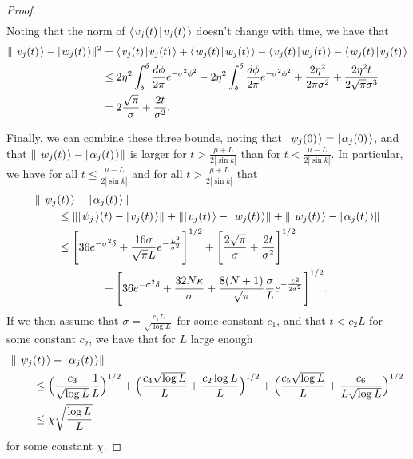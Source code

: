 \documentclass[../thesis-main/thesis-main]{subfiles}
\begin{document}
\begin{proof}
\begin{align}
\end{align}
Noting that the norm of $\langle\mspace{2mu} v_j(t) \mspace{2mu} | \mspace{2mu} v_j(t)\mspace{2mu} \rangle$ doesn't change with time, we have that
\begin{align}
  \|{|\mspace{2mu} v_j(t) \mspace{2mu} \rangle - |\mspace{2mu} w_j(t) \mspace{2mu} \rangle}\|^2 &= \langle\mspace{2mu} v_j(t) \mspace{2mu} | \mspace{2mu} v_j(t)\mspace{2mu} \rangle + \langle\mspace{2mu} w_j(t) \mspace{2mu} | \mspace{2mu} w_j(t)\mspace{2mu} \rangle - \langle\mspace{2mu} v_j(t) \mspace{2mu} | \mspace{2mu} w_j(t)\mspace{2mu} \rangle - \langle\mspace{2mu} w_j(t) \mspace{2mu} | \mspace{2mu} v_j(t)\mspace{2mu} \rangle\\
  &\leq 2 \eta^2 \int_{\delta}^\delta \frac{d\phi}{2\pi} e^{-\sigma^2 \phi^2} - 2\eta^2 \int_{\delta}^\delta \frac{d\phi}{2\pi }e^{ - \sigma^2 \phi^2} + \frac{2\eta^2}{2\pi \sigma^2} + \frac{2 \eta^2 t}{2\sqrt{\pi} \sigma^3}\\
  &= 2 \frac{\sqrt{\pi}}{ \sigma} + \frac{2 t }{\sigma^2}.
\end{align}

Finally, we can combine these three bounds, noting that $|\mspace{2mu} \psi_j(0) \mspace{2mu} \rangle = |\mspace{2mu} \alpha_j(0) \mspace{2mu} \rangle$, and that $\|{|\mspace{2mu} w_j(t) \mspace{2mu} \rangle - |\mspace{2mu} \alpha_j(t) \mspace{2mu} \rangle}\| $ is larger for $ t > \frac{\mu+L}{2|\sin k|}$ than for $t < \frac{\mu- L}{2|\sin k|}$.  In particular, we have for all $t \leq \frac{\mu -L}{2 |\sin k|}$ and for all $t > \frac{\mu + L}{2|\sin k|}$ that
\begin{align}
  &\|{ |\mspace{2mu} \psi_j(t) \mspace{2mu} \rangle - |\mspace{2mu} \alpha_j(t) \mspace{2mu} \rangle}\|\nonumber\\
   &\qquad \leq \|{ |\mspace{2mu} \psi_j \mspace{2mu} \rangle{(t)} - |\mspace{2mu} v_j(t) \mspace{2mu} \rangle}\| + \|{|\mspace{2mu}  v_j(t) \mspace{2mu} \rangle - |\mspace{2mu} w_j(t) \mspace{2mu} \rangle}\| + \|{|\mspace{2mu} w_j(t) \mspace{2mu} \rangle - |\mspace{2mu} \alpha_j(t) \mspace{2mu} \rangle}\|\\
  & \qquad \leq \Bigg[ 36 e^{-\sigma^2 \delta} + \frac{16 \sigma}{\sqrt{\pi} L} e^{-\frac{L^2}{\sigma^2}} \Bigg]^{1/2} + \Bigg[ \frac{2 \sqrt{\pi}}{\sigma} + \frac{2t}{\sigma^2}\Bigg]^{1/2} \nonumber\\
  &\qquad \qquad \qquad + \Bigg[36 e^{ -\sigma^2 \delta} + \frac{32 N \kappa}{\sigma} + \frac{8 (N+1)}{\sqrt{\pi}} \frac{\sigma}{L} e^{-\frac{L^2}{2\sigma^2}} \Bigg] ^{1/2}.
\end{align}
If we then assume that $\sigma = \frac{ c_1 L}{\sqrt{\log L}}$ for some constant $c_1$, and that $t < c_2 L$ for some constant $c_2$, we have that for $L$ large enough
\begin{align}
  &\|{ |\mspace{2mu} \psi_j(t) \mspace{2mu} \rangle - |\mspace{2mu} \alpha_j(t) \mspace{2mu} \rangle}\|\nonumber\\
   & \qquad \leq \Big( \frac{ c_3}{\sqrt{\log{L}}} \frac{1}{L} \Big)^{1/2} + \Big(\frac{c_4\sqrt{ \log L}}{L} + \frac{ c_2 \log L}{L}   \Big)^{1/2} + \Big( \frac{ c_5\sqrt{\log L}}{L} + \frac{c_6}{L\sqrt{\log L}}\Big)^{1/2}\\
   &\qquad \leq \chi  \sqrt{\frac{\log L}{L}}
\end{align}
for some constant $\chi$.

\end{proof}
\end{document}
